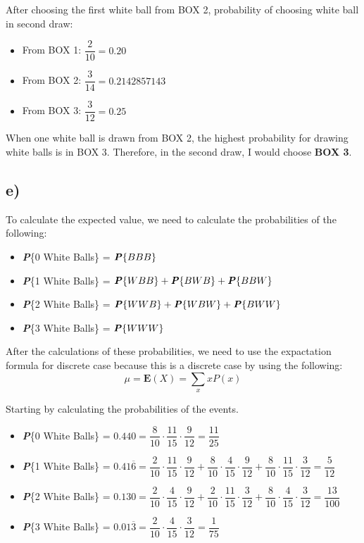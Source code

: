 \documentclass[12pt]{article}
\newcommand{\prob}[1]{\textbf{\textit{P}}\{#1\}}
\newcommand{\expc}[1]{\mathbf{E}(#1)} %
\begin{document}
After choosing the first white ball from BOX 2, probability of choosing white ball in second draw:
\begin{itemize}
    \item From BOX 1: $\dfrac{2}{10} = 0.20$
    \item From BOX 2: $\dfrac{3}{14} = 0.2142857143$
    \item From BOX 3: $\dfrac{3}{12} = 0.25$
\end{itemize}

\noindent When one white ball is drawn from BOX 2, the highest probability for drawing white balls is in BOX 3. Therefore, in the second draw, I would choose \textbf{BOX 3}.

\subsection*{e)}

To calculate the expected value, we need to calculate the probabilities of the following:

\begin{itemize}
    \item \prob{0 White Balls} = $\prob{BBB}$
    \item \prob{1 White Balls} = $\prob{WBB} + \prob{BWB} + \prob{BBW}$
    \item \prob{2 White Balls} = $\prob{WWB} + \prob{WBW} + \prob{BWW}$
    \item \prob{3 White Balls} = $\prob{WWW}$
\end{itemize}

\noindent After the calculations of these probabilities, we need to use the expactation formula for discrete case because this is a discrete case by using the following:
\begin{equation*}
    \mu = \expc{X} = \sum_x x P(x) 
\end{equation*}

\noindent Starting by calculating the probabilities of the events.
\begin{itemize}
    \item \prob{0 White Balls} = $0.440 = 
        \dfrac{8}{10} \cdot \dfrac{11}{15} \cdot \dfrac{9}{12} = \dfrac{11}{25}$
    \item \prob{1 White Balls} = $0.41\overline{6} = 
        \dfrac{2}{10} \cdot \dfrac{11}{15} \cdot \dfrac{9}{12} + 
        \dfrac{8}{10} \cdot \dfrac{4}{15} \cdot \dfrac{9}{12} + 
        \dfrac{8}{10} \cdot \dfrac{11}{15} \cdot \dfrac{3}{12} 
        = \dfrac{5}{12}$
    \item \prob{2 White Balls} = $0.130 =
        \dfrac{2}{10} \cdot \dfrac{4}{15} \cdot \dfrac{9}{12} + 
        \dfrac{2}{10} \cdot \dfrac{11}{15} \cdot \dfrac{3}{12} + 
        \dfrac{8}{10} \cdot \dfrac{4}{15} \cdot \dfrac{3}{12} 
        = \dfrac{13}{100}$
    \item \prob{3 White Balls} = $0.01\overline{3} = 
        \dfrac{2}{10} \cdot \dfrac{4}{15} \cdot \dfrac{3}{12} 
        = \dfrac{1}{75}$
\end{itemize}
\end{document}
